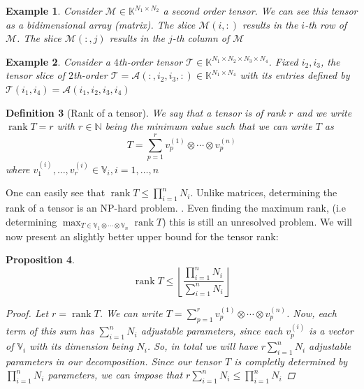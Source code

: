 \documentclass[11pt,a4paper,openright,oneside]{book}
\numberwithin{equation}{section}
\newtheorem{defn0}{Definition}[chapter]
\newtheorem{prop0}[defn0]{Proposition}
\newtheorem{example0}[defn0]{Example}
\newenvironment{definition}{ \begin{defn0}}{\end{defn0}}
\newenvironment{proposition}{\bigskip \begin{prop0}}{\end{prop0}}
\newenvironment{example}{ \begin{example0}\rm}{\end{example0}}
\DeclareMathOperator{\rank}{rank}
\begin{document}
\begin{example}
    Consider $\mathcal{M} \in \mathbb{K}^{N_1 \times N_2}$ a second order tensor. We can see this tensor as a
    bidimensional array (matrix). The slice $\mathcal{M}(i, :)$ results in the $i$-th row of $\mathcal{M}$.
    The slice $\mathcal{M}(:, j)$ results in the $j$-th column of $\mathcal{M}$
\end{example}

\begin{example}
    Consider a $4$th-order tensor $\mathcal{T} \in \mathbb{K}^{N_1 \times N_2 \times N_3 \times N_4}$. 
    Fixed $i_2, i_3$, the tensor slice of $2$th-order $\mathcal{T} = \mathcal{A}(:, i_2, i_3, :) \in \mathbb{K}^{N_1 \times N_4}$ 
    with its entries defined by ${\mathcal{T}(i_1, i_4) = \mathcal{A}(i_1, i_2, i_3, i_4)}$
\end{example}

\begin{definition}[Rank of a tensor] 
    We say that a tensor is of rank $r$ and we write $\rank{T} = r$
    with $r \in \mathbb{N}$ being the minimum value such that we can write $T$ as
$$T= \sum_{p=1}^r v_p^{(1)} \otimes \cdots \otimes v_p^{(n)}$$
where $v_1^{(i)}, \dots, v_r^{(i)} \in \mathbb{V}_i, i = 1, \dots, n$
\end{definition}

One can easily see that $\rank{T} \leqslant \prod_{i=1}^n N_i$.
Unlike matrices, determining the rank of a tensor is an NP-hard problem. \cite{hillarMostTensorProblems2013}. Even
finding the maximum rank, (i.e determining $\max_{T \in \mathbb{V}_1 \otimes \cdots \otimes \mathbb{V}_n} \rank{T}$) this is still an unresolved problem.
We will now present an slightly better upper bound for the tensor rank:
\begin{proposition}
    \begin{equation} \label{eq:rank-dimensional-bound}
        \rank{T} \leqslant \left\lfloor \frac{\prod_{i=1}^n N_i}{\sum_{i=1}^n N_i} \right\rfloor
    \end{equation}

\begin{proof}
    Let $r = \rank{T}$. We can write $T = \sum_{p=1}^r v_p^{(1)} \otimes \cdots \otimes v_p^{(n)}$. Now, each term of this
    sum has $\sum_{i=1}^n N_i$ adjustable parameters, since each $v_p^{(i)}$ is a vector of $\mathbb{V}_i$ with its dimension being $N_i$.
    So, in total we will have $r \sum_{i=1}^n N_i$ adjustable parameters in our decomposition. Since our tensor $T$ is completly
    determined by $\prod_{i=1}^n N_i$ parameters, we can impose that $r \sum_{i=1}^n N_i \leqslant \prod_{i=1}^n N_i$ 
\end{proof}
\end{proposition}
\end{document}
